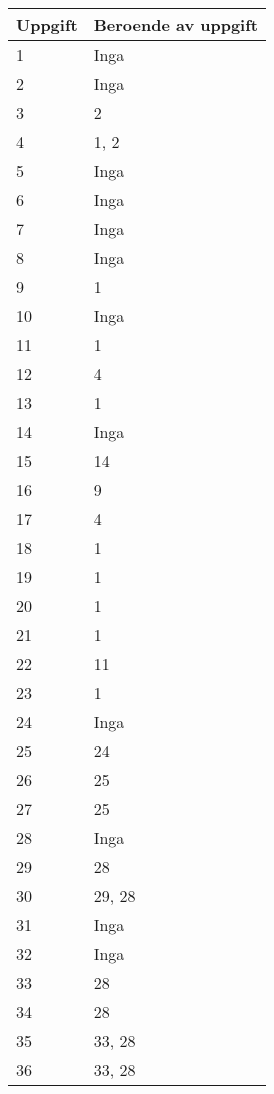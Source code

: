 \documentclass[a4paper, twoside, 11pt, titlepage]{article}
\begin{document}
	\begin {table} [ht] \begin{tabular} {  p{7.5cm} p{7.5cm} }
		\hline
		{\sffamily\textbf{Uppgift}} & {\sffamily\textbf{Beroende av uppgift}} \\
		\hline
		{1} & {Inga} \\
		\hline
		{2} & {Inga} \\
		\hline
		{3} & {2} \\
		\hline
		{4} & {1, 2} \\
		\hline
		{5} & {Inga} \\
		\hline
		{6} & {Inga} \\
		\hline
		{7} & {Inga} \\
		\hline
		{8} & {Inga} \\
		\hline
		{9} & {1} \\
		\hline
		{10} & {Inga} \\
		\hline
		{11} & {1} \\
		\hline
		{12} & {4} \\
		\hline
		{13} & {1} \\
		\hline
		{14} & {Inga} \\
		\hline
		{15} & {14} \\
		\hline
		{16} & {9} \\
		\hline
		{17} & {4} \\
		\hline
		{18} & {1} \\
		\hline
		{19} & {1} \\
		\hline
		{20} & {1} \\
		\hline
		{21} & {1} \\
		\hline
		{22} & {11} \\
		\hline
		{23} & {1} \\
		\hline
		{24} & {Inga} \\
		\hline
		{25} & {24} \\
		\hline
		{26} & {25} \\
		\hline
		{27} & {25} \\
		\hline
		{28} & {Inga} \\
		\hline
		{29} & {28} \\
		\hline
		{30} & {29, 28} \\
		\hline
		{31} & {Inga} \\
		\hline
		{32} & {Inga} \\
		\hline
		{33} & {28} \\
		\hline
		{34} & {28} \\
		\hline
		{35} & {33, 28} \\
		\hline
		{36} & {33, 28} \\
		\hline
	\end{tabular} \end{table} \FloatBarrier
	\vspace{6mm}
\end{document}
